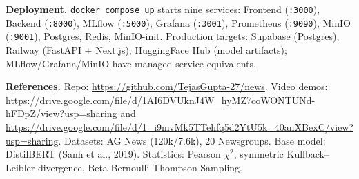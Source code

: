 \documentclass[11pt, a4paper]{article}
\begin{document}
\textbf{Deployment.} \texttt{docker compose up} starts nine services: Frontend (\texttt{:3000}), Backend (\texttt{:8000}), MLflow (\texttt{:5000}), Grafana (\texttt{:3001}), Prometheus (\texttt{:9090}), MinIO (\texttt{:9001}), Postgres, Redis, MinIO-init. Production targets: Supabase (Postgres), Railway (FastAPI + Next.js), HuggingFace Hub (model artifacts); MLflow/Grafana/MinIO have managed-service equivalents.

\textbf{References.} Repo: \url{https://github.com/TejasGupta-27/news}. Video demos: \url{https://drive.google.com/file/d/1AI6DVUknJ4W_hyMZ7coWONTUNd-hFDpZ/view?usp=sharing} and \url{https://drive.google.com/file/d/1_i9mvMk5TTehfq5d2YtU5k_40anXBexC/view?usp=sharing}. Datasets: AG News (120k/7.6k), 20 Newsgroups. Base model: DistilBERT (Sanh et al., 2019). Statistics: Pearson $\chi^2$, symmetric Kullback--Leibler divergence, Beta-Bernoulli Thompson Sampling.
\end{document}
